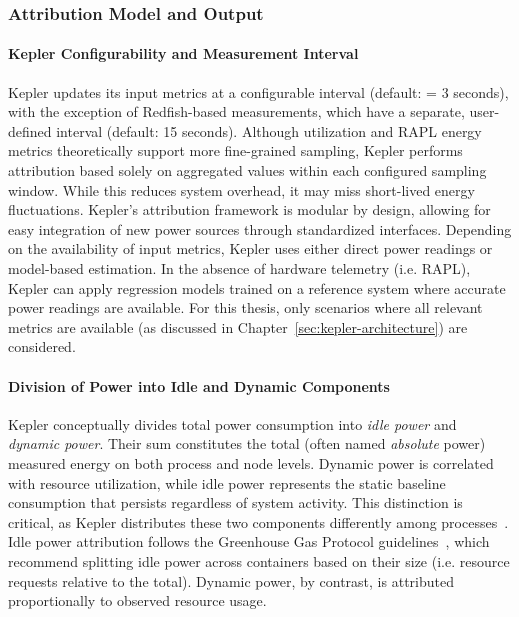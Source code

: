\subsubsection{Attribution Model and Output}
\label{sec:kepler-attribution}

\paragraph{Kepler Configurability and Measurement Interval}
Kepler updates its input metrics at a configurable interval (default:  = 3 seconds), with the exception of Redfish-based measurements, which have a separate, user-defined interval (default: 15 seconds). Although utilization and RAPL energy metrics theoretically support more fine-grained sampling, Kepler performs attribution based solely on aggregated values within each configured sampling window. While this reduces system overhead, it may miss short-lived energy fluctuations. Kepler's attribution framework is modular by design, allowing for easy integration of new power sources through standardized interfaces. Depending on the availability of input metrics, Kepler uses either direct power readings or model-based estimation. In the absence of hardware telemetry (i.e. RAPL), Kepler can apply regression models trained on a reference system where accurate power readings are available. For this thesis, only scenarios where all relevant metrics are available (as discussed in Chapter~\ref{sec:kepler-architecture}) are considered.

\paragraph{Division of Power into Idle and Dynamic Components}
Kepler conceptually divides total power consumption into \emph{idle power} and \emph{dynamic power}. Their sum constitutes the total (often named \emph{absolute} power) measured energy on both process and node levels. Dynamic power is correlated with resource utilization, while idle power represents the static baseline consumption that persists regardless of system activity. This distinction is critical, as Kepler distributes these two components differently among processes~\parencite{amaral2023exploring}. Idle power attribution follows the Greenhouse Gas Protocol guidelines~\parencite{gesi2024ictguidance}, which recommend splitting idle power across containers based on their size (i.e. resource requests relative to the total). Dynamic power, by contrast, is attributed proportionally to observed resource usage.

